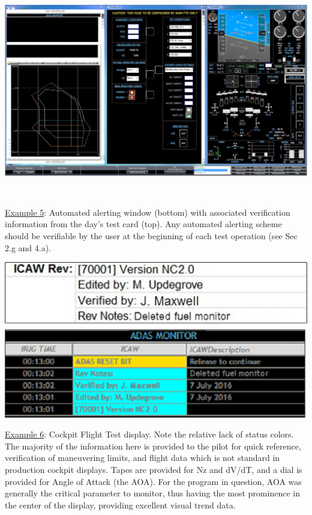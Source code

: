 \documentclass[
]{book}
\begin{document}
\includegraphics[width=6.47083in,height=3.64792in]{media/21/image8.png}

\underline{Example 5}: Automated alerting window (bottom) with associated verification information from the day's test card (top). Any automated alerting scheme should be verifiable by the user at the beginning of each test operation (see Sec 2.g and 4.a).

\includegraphics{media/21/icaw.png}

\underline{Example 6}: Cockpit Flight Test display. Note the relative lack of status colors. The majority of the information here is provided to the pilot for quick reference, verification of maneuvering limits, and flight data which is not standard in production cockpit displays. Tapes are provided for Nz and dV/dT, and a dial is provided for Angle of Attack (the AOA). For the program in question, AOA was generally the critical parameter to monitor, thus having the most prominence in the center of the display, providing excellent visual trend data.
\end{document}
